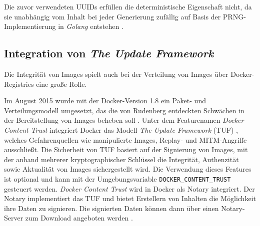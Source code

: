 \documentclass[../main.tex]{subfiles}
\begin{document}
      Die zuvor verwendeten UUIDs erfüllen die deterministische Eigenschaft nicht, da sie unabhängig vom Inhalt bei jeder Generierung zufällig auf Basis der PRNG-Implementierung in \emph{Golang} entstehen \cite{githubImageUUID}.





    \subsection{Integration von \emph{The Update Framework}}
    \label{tuf}
      Die Integrität von Images spielt auch bei der Verteilung von Images über Docker-Registries eine große Rolle.

      Im August 2015 wurde mit der Docker-Version 1.8 ein Paket- und Verteilungsmodell umgesetzt, das die von Rudenberg entdeckten Schwächen in der Bereitstellung von Images beheben soll \cite{dockerContentTrust}. Unter dem Featurenamen \emph{Docker Content Trust} integriert Docker das Modell \emph{The Update Framework} (\acrshort{TUF}) \cite{tufFramework}, welches Gefahrenquellen wie manipulierte Images, Replay- und MITM-Angriffe ausschließt. Die Sicherheit von TUF basiert auf der Signierung von Images, mit der anhand mehrerer kryptographischer Schlüssel die Integrität, Authenzität sowie Aktualität von Images sichergestellt wird. Die Verwendung dieses Features ist optional und kann mit der Umgebungsvariable \texttt{DOCKER\_CONTENT\_TRUST} gesteuert werden. \emph{Docker Content Trust} wird in Docker als Notary integriert. Der Notary implementiert das TUF und bietet Erstellern von Inhalten die Möglichkeit ihre Daten zu signieren. Die signierten Daten können dann über einen Notary-Server zum Download angeboten werden \cite{githubNotary}\cite{dockerContentTrust}.
\end{document}
